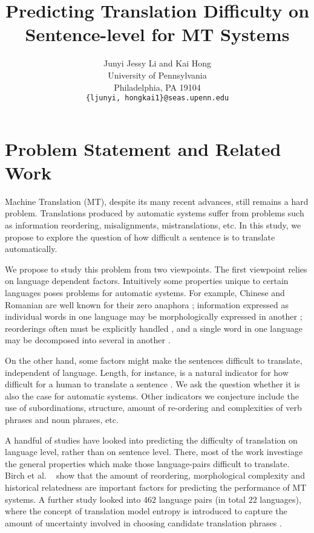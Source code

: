 \documentclass[11pt]{article}
\title{Predicting Translation Difficulty on Sentence-level for MT Systems}
\author{
	Junyi Jessy Li and Kai Hong\\
   University of Pennsylvania \\
   Philadelphia, PA 19104 \\
  	{\tt \{ljunyi, hongkai1\}@seas.upenn.edu}}
\begin{document}
\maketitle

\section{Problem Statement and Related Work}
Machine Translation (MT), despite its many recent advances, still remains a hard problem. 
Translations produced by automatic systems suffer from problems such as information reordering, misalignments, mistranslations, etc. 
In this study, we propose to explore the question of how difficult a sentence is to translate automatically. 

We propose to study this problem from two viewpoints. The first viewpoint relies on language dependent factors.
Intuitively some properties unique to certain languages poses problems for automatic systems.
For example, Chinese and Romanian are well known for their zero anaphora \cite{zhao-ng:2007:EMNLP-CoNLL2007,mihuailua2011zero}; 
information expressed as individual words in one language may be morphologically expressed in another \cite{minkov-toutanova-suzuki:2007:ACLMain}; 
reorderings often must be explicitly handled \cite{Wang07chinesesyntactic}, and a single word in one language may be decomposed into several in another \cite{maja-compound}. 

On the other hand, some factors might make the sentences difficult to translate, independent of language.
Length, for instance, is a natural indicator for how difficult for a human to translate a sentence \cite{mishra-bhattacharyya-carl:2013:Short}. 
We ask the question whether it is also the case for automatic systems. 
Other indicators we conjecture include the use of subordinations, structure, amount of re-ordering and complexities of verb phrases and noun phrases, etc.

A handful of studies have looked into predicting the difficulty of translation on language level, rather than on sentence level. 
There, most of the work investiage the general properties which make those language-pairs difficult to translate.
Birch et al. ~ show that the amount of reordering, morphological complexity and historical relatedness are important factors for predicting the performance of MT systems.
A further study looked into $462$ language pairs (in total $22$ languages), where the concept of translation model entropy is introduced to capture the amount of uncertainty involved in choosing candidate translation phrases \cite{sys462}.
\end{document}
